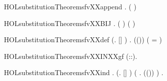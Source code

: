 \newcommand{\HOLsubstitutionTheoremsfvXXOneXXOne}{\UseVerbatim{HOLsubstitutionTheoremsfvXXOneXXOne}}
\begin{SaveVerbatim}{HOLsubstitutionTheoremsfvXXappend}
\HOLTokenTurnstile{} \HOLSymConst{\HOLTokenForall{}} .  ( \HOLSymConst{++} ) \HOLSymConst{=}   \HOLConst{\HOLTokenCompose}  
\end{SaveVerbatim}
\newcommand{\HOLsubstitutionTheoremsfvXXappend}{\UseVerbatim{HOLsubstitutionTheoremsfvXXappend}}
\begin{SaveVerbatim}{HOLsubstitutionTheoremsfvXXBIJ}
\HOLTokenTurnstile{} \HOLSymConst{\HOLTokenForall{}} .    \HOLSymConst{\HOLTokenImp{}}  ( )  (  )
\end{SaveVerbatim}
\newcommand{\HOLsubstitutionTheoremsfvXXBIJ}{\UseVerbatim{HOLsubstitutionTheoremsfvXXBIJ}}
\begin{SaveVerbatim}{HOLsubstitutionTheoremsfvXXdef}
\HOLTokenTurnstile{} (\HOLSymConst{\HOLTokenForall{}}.  []  \HOLSymConst{=} ) \HOLSymConst{\HOLTokenConj{}}
   \HOLSymConst{\HOLTokenForall{}}   .
      ((\HOLSymConst{,})\HOLSymConst{::})  \HOLSymConst{=}
     (  =       \HOLSymConst{=}     )
\end{SaveVerbatim}
\newcommand{\HOLsubstitutionTheoremsfvXXdef}{\UseVerbatim{HOLsubstitutionTheoremsfvXXdef}}
\begin{SaveVerbatim}{HOLsubstitutionTheoremsfvXXINXXgf}
\HOLTokenTurnstile{} \HOLSymConst{\HOLTokenForall{}}  (::).    \HOLConst{\HOLTokenIn{}}   
\end{SaveVerbatim}
\newcommand{\HOLsubstitutionTheoremsfvXXINXXgf}{\UseVerbatim{HOLsubstitutionTheoremsfvXXINXXgf}}
\begin{SaveVerbatim}{HOLsubstitutionTheoremsfvXXind}
\HOLTokenTurnstile{} \HOLSymConst{\HOLTokenForall{}}.
     (\HOLSymConst{\HOLTokenForall{}}.  [] ) \HOLSymConst{\HOLTokenConj{}} (\HOLSymConst{\HOLTokenForall{}}   .    \HOLSymConst{\HOLTokenImp{}}  ((\HOLSymConst{,})\HOLSymConst{::}) ) \HOLSymConst{\HOLTokenImp{}}
     \HOLSymConst{\HOLTokenForall{}} .   
\end{SaveVerbatim}
